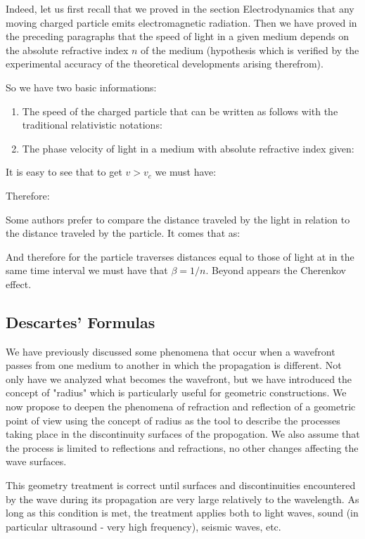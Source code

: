 	Indeed, let us first recall that we proved in the section Electrodynamics that any moving charged particle emits electromagnetic radiation. Then we have proved in the preceding paragraphs that the speed of light in a given medium depends on the absolute refractive index $n$ of the medium (hypothesis which is verified by the experimental accuracy of the theoretical developments arising therefrom).
	
	So we have two basic informations:
	\begin{enumerate}
		\item The speed of the charged particle that can be written as follows with the traditional relativistic notations:
		

		\item The phase velocity of light in a medium with absolute refractive index given:
		
	\end{enumerate}
	It is easy to see that to get $v>v_c$ we must have:
	
	Therefore:
	
	Some authors prefer to compare the distance traveled by the light in relation to the distance traveled by the particle. It comes that as:
	
	And therefore for the particle traverses distances equal to those of light at in the same time interval we must have that $\beta=1/n$. Beyond appears the Cherenkov effect.
	
	\pagebreak
	\subsection{Descartes' Formulas}
	We have previously discussed some phenomena that occur when a wavefront passes from one medium to another in which the propagation is different. Not only have we analyzed what becomes the wavefront, but we have introduced the concept of "radius" which is particularly useful for geometric constructions. We now propose to deepen the phenomena of refraction and reflection of a geometric point of view using the concept of radius as the tool to describe the processes taking place in the discontinuity surfaces of the propogation. We also assume that the process is limited to reflections and refractions, no other changes affecting the wave surfaces.

	This geometry treatment is correct until surfaces and discontinuities encountered by the wave during its propagation are very large relatively to the wavelength. As long as this condition is met, the treatment applies both to light waves, sound (in particular ultrasound - very high frequency), seismic waves, etc.

